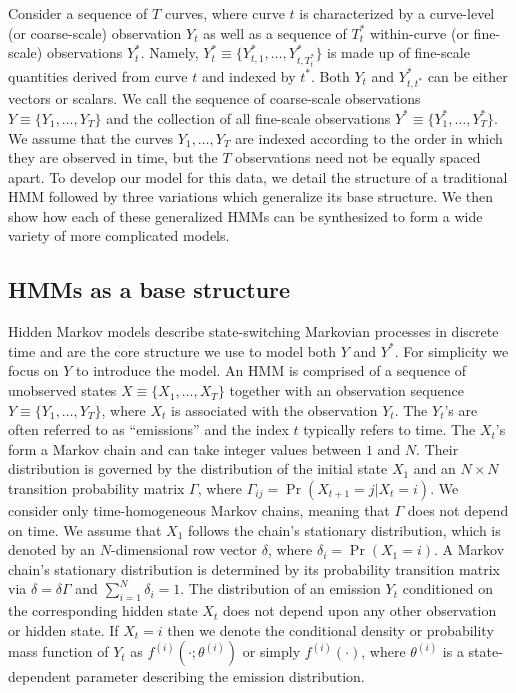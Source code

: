 
Consider a sequence of $T$ curves, where curve $t$ is characterized by a curve-level (or coarse-scale) observation $Y_t$ as well as a sequence of $T^*_t$ within-curve (or fine-scale) observations $Y^*_{t}$. Namely, $Y^*_{t} \equiv \big\{Y^*_{t,1},\ldots,Y^*_{t,T^*_t}\big\}$ is made up of fine-scale quantities derived from curve $t$ and indexed by $t^*$. Both $Y_t$ and $Y^*_{t,t^*}$ can be either vectors or scalars. We call the sequence of coarse-scale observations $Y \equiv \big\{Y_1, \ldots, Y_T\big\}$ and the collection of all fine-scale observations $Y^* \equiv \big\{Y^*_1,\ldots,Y^*_T \big\}$. We assume that the curves $Y_1,\ldots,Y_T$ are indexed according to the order in which they are observed in time, but the $T$ observations need not be equally spaced apart. To develop our model for this data, we detail the structure of a traditional HMM followed by three variations which generalize its base structure. We then show how each of these generalized HMMs can be synthesized to form a wide variety of more complicated models.

\subsection{HMMs as a base structure}
\label{subsec:HMM}

Hidden Markov models describe state-switching Markovian processes in discrete time and are the core structure we use to model both $Y$ and $Y^*$. For simplicity we focus on $Y$ to introduce the model. An HMM is comprised of a sequence of unobserved states $X \equiv \big\{X_1, \ldots, X_T\big\}$ together with an observation sequence $Y \equiv \big\{Y_1, \ldots, Y_T\big\}$, where $X_t$ is associated with the observation $Y_t$. The $Y_t$'s are often referred to as ``emissions'' and the index $t$ typically refers to time. 
The $X_t$'s form a Markov chain and can take integer values between $1$ and $N$. Their distribution is governed by the distribution of the initial state $X_1$ and an $N \times N$ transition probability matrix $\Gamma$, where $\Gamma_{ij} = \Pr(X_{t+1} = j | X_t = i)$. We consider only time-homogeneous Markov chains, meaning that $\Gamma$ does not depend on time.
%
We assume that $X_1$ follows the chain's stationary distribution, which is denoted by an $N$-dimensional row vector $\delta$, where
$\delta_i = \Pr(X_1 = i).$
A Markov chain's stationary distribution is determined by its probability transition matrix via $\delta = \delta \Gamma$ and $\sum_{i=1}^N \delta_i = 1$.
%
The distribution of an emission $Y_t$ conditioned on the corresponding hidden state $X_t$ does not depend upon any other observation or hidden state.
%
If $X_t=i$ then we denote the conditional density or probability mass function of $Y_t$ as $f^{(i)}(\cdot ; \theta^{(i)})$ or simply $f^{(i)}(\cdot)$, where $\theta^{(i)}$ is a state-dependent parameter describing the emission distribution.
%


